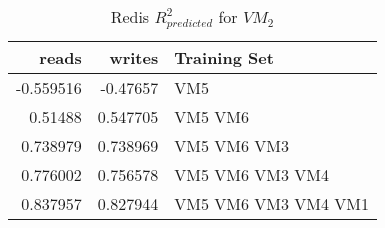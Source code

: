 \begin{table}
\centering
\caption{Redis $R_{predicted}^2$ for $VM_2$}
\begin{tabular}{|r|r|l|} \hline
reads&writes&Training Set\\ \hline
-0.559516 & -0.47657  & VM5 \\ \hline 
0.51488 & 0.547705  & VM5 VM6 \\ \hline 
0.738979 & 0.738969  & VM5 VM6 VM3 \\ \hline 
0.776002 & 0.756578  & VM5 VM6 VM3 VM4 \\ \hline 
0.837957 & 0.827944  & VM5 VM6 VM3 VM4 VM1 \\ \hline 
\hline\end{tabular}
\label{table:redis4}
\end{table}
 


